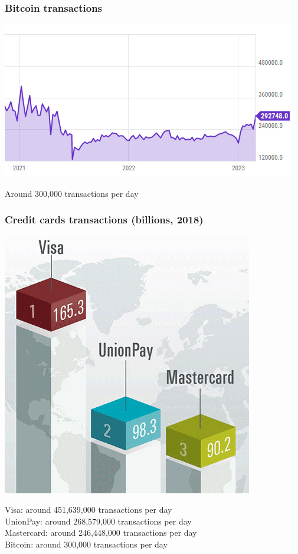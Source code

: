 \documentclass[11pt]{beamer}  %
\begin{document}
\begin{frame}\frametitle{Bitcoin transactions}

  \begin{center}
    \includegraphics[scale=0.7,clip=false]{pictures/bitcoin-daily.png}
  \end{center}

  \begin{center}
    Around 300,000 transactions per day
  \end{center}

\end{frame}

\begin{frame}\frametitle{Credit cards transactions (billions, 2018)}

  \begin{center}
    \includegraphics[scale=0.3,clip=false]{pictures/credit-cards.png}
  \end{center}

  \begin{center}
    Visa: around 451,639,000 transactions per day\\
    UnionPay: around 268,579,000 transactions per day\\
    Mastercard: around 246,448,000 transactions per day\\
    Bitcoin: around 300,000 transactions per day
  \end{center}

\end{frame}
\end{document}
